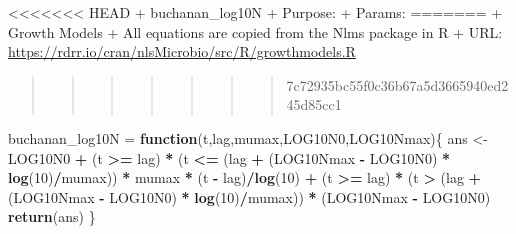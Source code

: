 \documentclass[]{article}
\newenvironment{Shaded}{\begin{snugshade}}{\end{snugshade}}
\newcommand{\ControlFlowTok}[1]{\textcolor[rgb]{0.13,0.29,0.53}{\textbf{#1}}}
\newcommand{\DecValTok}[1]{\textcolor[rgb]{0.00,0.00,0.81}{#1}}
\newcommand{\KeywordTok}[1]{\textcolor[rgb]{0.13,0.29,0.53}{\textbf{#1}}}
\newcommand{\NormalTok}[1]{#1}
\newcommand{\OperatorTok}[1]{\textcolor[rgb]{0.81,0.36,0.00}{\textbf{#1}}}
\newcommand{\StringTok}[1]{\textcolor[rgb]{0.31,0.60,0.02}{#1}}
\begin{document}
\textless{}\textless{}\textless{}\textless{}\textless{}\textless{}\textless{}
HEAD + buchanan\_log10N + Purpose: + Params: ======= + Growth Models +
All equations are copied from the Nlms package in R + URL:
\url{https://rdrr.io/cran/nlsMicrobio/src/R/growthmodels.R}

\begin{quote}
\begin{quote}
\begin{quote}
\begin{quote}
\begin{quote}
\begin{quote}
\begin{quote}
7c72935bc55f0c36b67a5d3665940ed245d85cc1
\end{quote}
\end{quote}
\end{quote}
\end{quote}
\end{quote}
\end{quote}
\end{quote}

\begin{Shaded}
\begin{Highlighting}[]
\NormalTok{buchanan_log10N =}\StringTok{ }\ControlFlowTok{function}\NormalTok{(t,lag,mumax,LOG10N0,LOG10Nmax)\{}
\NormalTok{  ans <-}\StringTok{ }\NormalTok{LOG10N0 }\OperatorTok{+}\StringTok{ }\NormalTok{(t }\OperatorTok{>=}\StringTok{ }\NormalTok{lag) }\OperatorTok{*}\StringTok{ }\NormalTok{(t }\OperatorTok{<=}\StringTok{ }\NormalTok{(lag }\OperatorTok{+}\StringTok{ }\NormalTok{(LOG10Nmax }\OperatorTok{-}\StringTok{ }\NormalTok{LOG10N0) }\OperatorTok{*}\StringTok{ }\KeywordTok{log}\NormalTok{(}\DecValTok{10}\NormalTok{)}\OperatorTok{/}\NormalTok{mumax)) }\OperatorTok{*}\StringTok{ }\NormalTok{mumax }\OperatorTok{*}\StringTok{ }\NormalTok{(t }\OperatorTok{-}\StringTok{ }\NormalTok{lag)}\OperatorTok{/}\KeywordTok{log}\NormalTok{(}\DecValTok{10}\NormalTok{) }\OperatorTok{+}\StringTok{ }\NormalTok{(t }\OperatorTok{>=}\StringTok{ }\NormalTok{lag) }\OperatorTok{*}\StringTok{ }\NormalTok{(t }\OperatorTok{>}\StringTok{ }\NormalTok{(lag }\OperatorTok{+}\StringTok{ }\NormalTok{(LOG10Nmax }\OperatorTok{-}\StringTok{ }\NormalTok{LOG10N0) }\OperatorTok{*}\StringTok{ }\KeywordTok{log}\NormalTok{(}\DecValTok{10}\NormalTok{)}\OperatorTok{/}\NormalTok{mumax)) }\OperatorTok{*}\StringTok{ }\NormalTok{(LOG10Nmax }\OperatorTok{-}\StringTok{     }\NormalTok{LOG10N0)}
  \KeywordTok{return}\NormalTok{(ans)}
\NormalTok{\}}
\end{Highlighting}
\end{Shaded}
\end{document}
